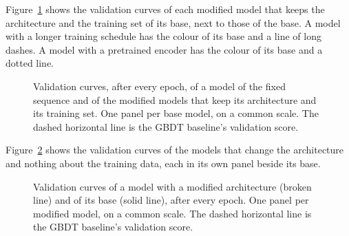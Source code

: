 \fi

\ifvariants
Figure~\ref{fig:variants} shows the validation curves of each modified model
that keeps the architecture and the training set of its base, next to those
of the base.
\ifchangeepochs
A model with a longer training schedule has the colour of its base and a line
of long dashes.
\fi
\ifchangestart
A model with a pretrained encoder has the colour of its base and a dotted
line.
\fi

\begin{figure}[htbp]\centering
{}
\caption{Validation curves, after every epoch, of a model of the fixed
sequence and of the modified models that keep its architecture and its
training set. One panel per base model, on a common scale. The dashed
horizontal line is the GBDT baseline's validation score.}
\label{fig:variants}
\end{figure}
\fi

\ifshapes
Figure~\ref{fig:shapes} shows the validation curves of the models that
change the architecture and nothing about the training data, each in its own
panel beside its base.

\begin{figure}[htbp]\centering
{}
\caption{Validation curves of a model with a modified architecture (broken
line) and of its base (solid line), after every epoch. One panel per modified
model, on a common scale. The dashed horizontal line is the GBDT baseline's
validation score.}
\label{fig:shapes}
\end{figure}
\fi
